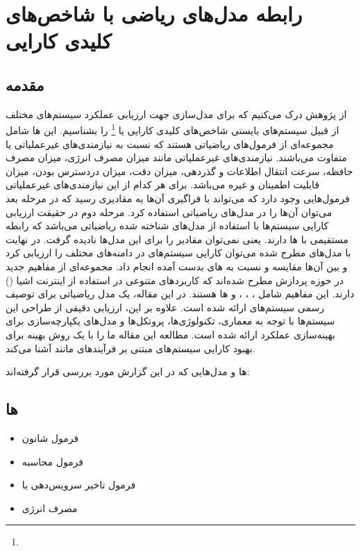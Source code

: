 \section{رابطه مدل‌های ریاضی با شاخص‌های کلیدی کارایی}

\subsection{مقدمه}

از پژوهش \cite{vcolakovic2023iot} درک می‌کنیم که برای مدل‌سازی جهت ارزیابی
عملکرد سیستم‌های مختلف از قبیل سیستم‌های  بایستی شاخص‌های کلیدی کارایی
یا  \footnote{} را بشناسیم. این
ها شامل مجموعه‌ای از فرمول‌های ریاضیاتی هستند که نسبت به نیازمندی‌های
غیرعملیاتی یا  متفاوت می‌باشند. نیازمندی‌های
غیرعملیاتی مانند میزان مصرف انرژی، میزان مصرف حافظه، سرعت انتقال اطلاعات و
گذردهی، میزان دقت، میزان دردسترس بودن، میزان قابلیت اطمینان و غیره می‌باشد. برای
هر کدام از این نیازمندی‌های غیرعملیاتی فرمول‌هایی وجود دارد که می‌تواند با
فراگیری آن‌ها به مقادیری رسید که در مرحله بعد می‌توان آن‌ها را در مدل‌های
ریاضیاتی استفاده کرد.  مرحله دوم در حقیقت ارزیابی کارایی سیستم‌ها با استفاده از
مدل‌های شناخته شده ریاضیاتی می‌باشد که رابطه مستقیمی با ‌ها دارند. یعنی
‌نمی‌توان مقادیر  را برای این مدل‌ها نادیده گرفت. در نهایت با مدل‌های
مطرح شده می‌توان کارایی سیستم‌های  در دامنه‌های مختلف را ارزیابی کرد و
بین آن‌ها مقایسه و  نسبت به های بدست آمده انجام داد.
مجموعه‌ای از مفاهیم جدید در حوزه پردازش مطرح شده‌اند که کاربردهای متنوعی در
استفاده از اینترنت اشیا () دارند. این مفاهیم شامل ،
، ،  و
 ‌ها هستند. در این مقاله، یک مدل ریاضیاتی برای توصیف رسمی سیستم‌های
 ارائه شده است. علاوه بر این، ارزیابی دقیقی از طراحی این سیستم‌ها با
توجه به معماری، تکنولوژی‌ها، پروتکل‌ها و مدل‌های یکپارچه‌سازی برای بهینه‌سازی
عملکرد ارائه شده است. مطالعه این مقاله ما را با یک روش بهینه برای بهبود کارایی
سیستم‌های مبتنی بر فرآیندهای  مانند  آشنا
می‌کند.

ها و مدل‌هایی که در این گزارش مورد بررسی قرار گرفته‌اند:

\subsection{ها}

\begin{itemize}
    \item فرمول شانون
    \item فرمول محاسبه 
    \item فرمول تاخیر سرویس‌دهی یا 
    \item مصرف انرژی
\end{itemize}

